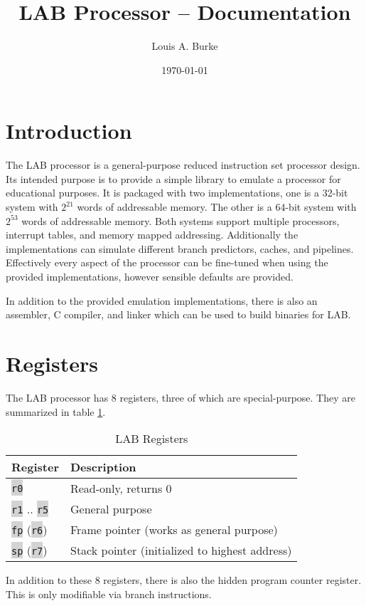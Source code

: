 \documentclass{article}
\title{LAB Processor -- Documentation}
\date{\today}
\author{Louis A. Burke}
\newcommand{\labcode}[1]{\colorbox{lightgray}{\lstinline[language=lab]{#1}}}
\begin{document}
\maketitle\clearpage

\section{Introduction}

The LAB processor is a general-purpose reduced instruction set processor design.
Its intended purpose is to provide a simple library to emulate a processor for
educational purposes. It is packaged with two implementations, one is a 32-bit
system with $2^21$ words of addressable memory. The other is a 64-bit system
with $2^53$ words of addressable memory. Both systems support multiple
processors, interrupt tables, and memory mapped addressing. Additionally the
implementations can simulate different branch predictors, caches, and pipelines.
Effectively every aspect of the processor can be fine-tuned when using the
provided implementations, however sensible defaults are provided.

In addition to the provided emulation implementations, there is also an
assembler, C compiler, and linker which can be used to build binaries for LAB.

\section{Registers}

The LAB processor has 8 registers, three of which are special-purpose. They are
summarized in table \ref{table:registers}.

\begin{table}[h!]
\centering
\begin{tabular}{ll}
    \toprule Register & Description \\ \midrule
    \labcode{r0} & Read-only, returns 0 \\
    \labcode{r1} .. \labcode{r5} & General purpose \\
    \labcode{fp} (\labcode{r6}) & Frame pointer (works as general purpose) \\
    \labcode{sp} (\labcode{r7}) & Stack pointer (initialized to highest address)
\end{tabular}
\caption{LAB Registers}
\label{table:registers}
\end{table}

In addition to these 8 registers, there is also the hidden program counter
register. This is only modifiable via branch instructions.
\end{document}
